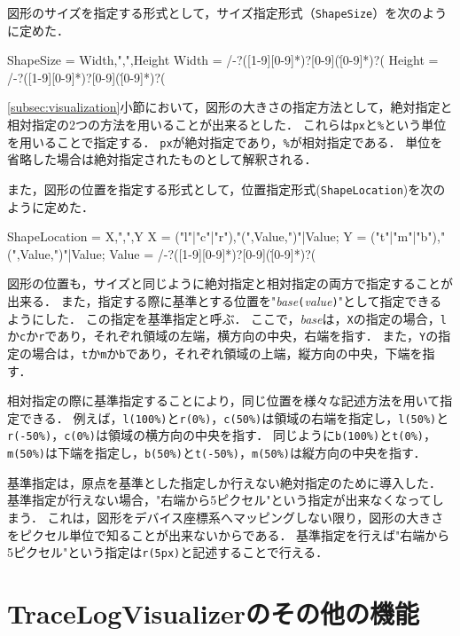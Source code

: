 図形のサイズを指定する形式として，サイズ指定形式（{\tt ShapeSize}）を次のように定めた．

\begin{EBNF}
ShapeSize = Width,",",Height
Width = /-?([1-9][0-9]*)?[0-9](\.[0-9]*)?(%
Height = /-?([1-9][0-9]*)?[0-9](\.[0-9]*)?(%
\end{EBNF}

\ref{subsec:visualization}小節において，図形の大きさの指定方法として，絶対指定と相対指定の2つの方法を用いることが出来るとした．
これらは{\tt px}と{\tt \%}という単位を用いることで指定する．
{\tt px}が絶対指定であり，{\tt \%}が相対指定である．
単位を省略した場合は絶対指定されたものとして解釈される．

また，図形の位置を指定する形式として，位置指定形式({\tt ShapeLocation})を次のように定めた．

\begin{EBNF}
ShapeLocation = X,",",Y
X = ("l"|"c"|"r"),"(",Value,")"|Value;
Y = ("t"|"m"|"b"),"(",Value,")"|Value;
Value = /-?([1-9][0-9]*)?[0-9](\.[0-9]*)?(%
\end{EBNF}

図形の位置も，サイズと同じように絶対指定と相対指定の両方で指定することが出来る．
また，指定する際に基準とする位置を"{\it base}\verb|(|{\it value}\verb|)|"として指定できるようにした．
この指定を基準指定と呼ぶ．
ここで，{\it base}は，{\tt X}の指定の場合，{\tt l}か{\tt c}か{\tt r}であり，それぞれ領域の左端，横方向の中央，右端を指す．
また，{\tt Y}の指定の場合は，{\tt t}か{\tt m}か{\tt b}であり，それぞれ領域の上端，縦方向の中央，下端を指す．

相対指定の際に基準指定することにより，同じ位置を様々な記述方法を用いて指定できる．
例えば，{\tt l(100\%)}と{\tt r(0\%)}，{\tt c(50\%)}は領域の右端を指定し，{\tt l(50\%)}と{\tt r(-50\%)}，{\tt c(0\%)}は領域の横方向の中央を指す．
同じように{\tt b(100\%)}と{\tt t(0\%)}，{\tt m(50\%)}は下端を指定し，{\tt b(50\%)}と{\tt t(-50\%)}，{\tt m(50\%)}は縦方向の中央を指す．

基準指定は，原点を基準とした指定しか行えない絶対指定のために導入した．
基準指定が行えない場合，"右端から5ピクセル"という指定が出来なくなってしまう．
これは，図形をデバイス座標系へマッピングしない限り，図形の大きさをピクセル単位で知ることが出来ないからである．
基準指定を行えば"右端から5ピクセル"という指定は{\tt r(5px)}と記述することで行える．

\section{TraceLogVisualizerのその他の機能}

